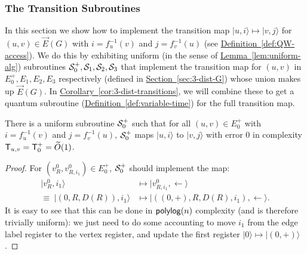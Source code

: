 \documentclass{article}
\renewcommand{\sec}[1]{\hyperref[sec:#1]{Section~\ref*{sec:#1}}}
\newcommand{\lem}[1]{\hyperref[lem:#1]{Lemma~\ref*{lem:#1}}}
\newcommand{\cor}[1]{\hyperref[cor:#1]{Corollary~\ref*{cor:#1}}}
\newcommand{\defin}[1]{\hyperref[def:#1]{Definition~\ref*{def:#1}}}
\def\ket#1{{\lvert}#1\rangle}
\renewcommand{\>}{\rangle}
\newcommand{\<}{\langle}
\renewcommand{\(}{\left(}
\renewcommand{\)}{\right)}
\begin{document}
\subsubsection{The Transition Subroutines}\label{sec:3-dist-transitions}

In this section we show how to implement the transition map  $\ket{u,i}{\mapsto}\ket{v,j}$ for $(u,v)\in\overrightarrow{E}(G)$ with $i=f_u^{-1}(v)$ and $j=f_v^{-1}(u)$ (see \defin{QW-access}). We do this by exhibiting uniform (in the sense of \lem{uniform-alg}) subroutines ${\cal S}_0^{+},{\cal S}_1,{\cal S}_2,{\cal S}_3$ that implement the transition map for $(u,v)$ in $E_0^{+},E_1,E_2,E_3$ respectively (defined in \sec{3-dist-G}) whose union makes up $\overrightarrow{E}(G)$. In \cor{3-dist-transitions}, we will combine these to get a quantum subroutine (\defin{variable-time}) for the full transition map. 

\begin{lemma}\label{lem:3-dist-T1}
There is a uniform subroutine ${\cal S}_0^{+}$ such that for all $(u,v)\in E_0^{+}$ with $i=f_u^{-1}(v)$ and $j=f_v^{-1}(u)$, ${\cal S}_0^+$ maps $\ket{u,i}$ to $\ket{v,j}$ with error 0 in complexity ${\sf T}_{u,v}={\sf T}_0^+=\widetilde{O}(1)$.
\end{lemma}
\begin{proof}
For $(v^0_{R},v^0_{R,i_1})\in E_0^+$, ${\cal S}_0^+$ should implement the map:
\begin{align*}
\ket{v^0_{R},i_1} &\mapsto \ket{v^0_{R,i_1},\leftarrow}\\
\equiv \; 
\ket{(0,R,D(R)),i_1} &\mapsto \ket{((0,+),R,D(R),i_1),\leftarrow}.
\end{align*}
It is easy to see that this can be done in ${\sf polylog}(n)$ complexity (and is therefore trivially uniform): we just need to do some accounting to move $i_1$ from the edge label register to the vertex register, and update the first register $\ket{0}\mapsto \ket{(0,+)}$. 
\end{proof}
\end{document}
